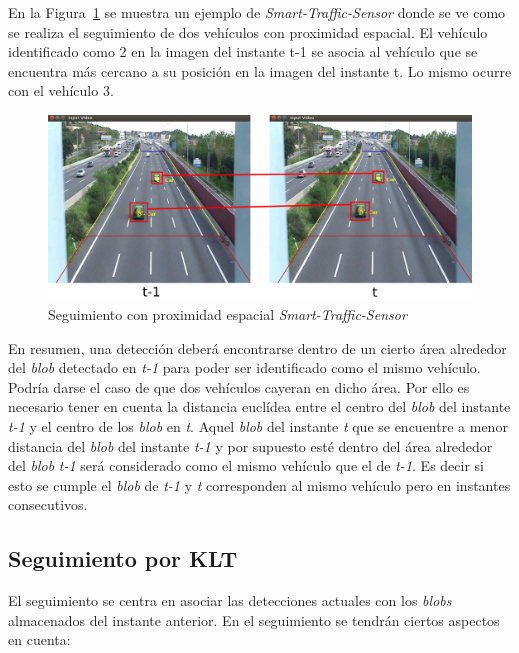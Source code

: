 En la Figura~\ref{fig.proximidad_espacial} se muestra un ejemplo de \textit{Smart-Traffic-Sensor} donde se ve como se realiza el seguimiento de dos vehículos con proximidad espacial. El vehículo identificado como 2 en la imagen del instante t-1 se asocia al vehículo que se encuentra más cercano a su posición en la imagen del instante t. Lo mismo ocurre con el vehículo 3.

 \begin{figure}[H] 
\begin{center}
   \includegraphics[scale=0.3]{figures/Diseno_global/proximidad_espacial.png}
   \caption{Seguimiento con proximidad espacial \textit{Smart-Traffic-Sensor}}
	\label{fig.proximidad_espacial}
\end{center}
\end{figure}

En resumen, una detección deberá encontrarse dentro de un cierto área alrededor del \textit{blob} detectado en \textit{t-1} para poder ser identificado como el mismo vehículo. Podría darse el caso de que dos vehículos cayeran en dicho área. Por ello es necesario tener en cuenta la distancia euclídea entre el centro del \textit{blob} del instante \textit{t-1} y el centro de los \textit{blob} en \textit{t}. Aquel \textit{blob} del instante \textit{t} que se encuentre a menor distancia del \textit{blob} del instante \textit{t-1} y por supuesto esté dentro del área alrededor del \textit{blob} \textit{t-1} será considerado como el mismo vehículo que el de \textit{t-1}. Es decir si esto se cumple el \textit{blob} de \textit{t-1} y \textit{t} corresponden al  mismo vehículo pero en instantes consecutivos.

\subsection{Seguimiento por KLT}

El seguimiento se centra en asociar las detecciones actuales con los \textit{blobs} almacenados del instante anterior. En el seguimiento se tendrán ciertos aspectos en cuenta:

